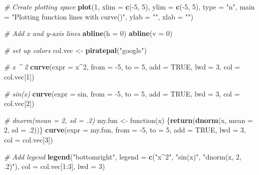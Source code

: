 \documentclass[]{book}
\newenvironment{Shaded}{\begin{snugshade}}{\end{snugshade}}
\newcommand{\KeywordTok}[1]{\textcolor[rgb]{0.13,0.29,0.53}{\textbf{{#1}}}}
\newcommand{\DataTypeTok}[1]{\textcolor[rgb]{0.13,0.29,0.53}{{#1}}}
\newcommand{\DecValTok}[1]{\textcolor[rgb]{0.00,0.00,0.81}{{#1}}}
\newcommand{\StringTok}[1]{\textcolor[rgb]{0.31,0.60,0.02}{{#1}}}
\newcommand{\CommentTok}[1]{\textcolor[rgb]{0.56,0.35,0.01}{\textit{{#1}}}}
\newcommand{\OtherTok}[1]{\textcolor[rgb]{0.56,0.35,0.01}{{#1}}}
\newcommand{\NormalTok}[1]{{#1}}
\theoremstyle{definition}
\theoremstyle{definition}
\theoremstyle{remark}
\begin{document}
\begin{Shaded}
\begin{Highlighting}[]
\CommentTok{# Create plotting space}
\KeywordTok{plot}\NormalTok{(}\DecValTok{1}\NormalTok{, }
     \DataTypeTok{xlim =} \KeywordTok{c}\NormalTok{(-}\DecValTok{5}\NormalTok{, }\DecValTok{5}\NormalTok{), }\DataTypeTok{ylim =} \KeywordTok{c}\NormalTok{(-}\DecValTok{5}\NormalTok{, }\DecValTok{5}\NormalTok{),}
     \DataTypeTok{type =} \StringTok{"n"}\NormalTok{, }
     \DataTypeTok{main =} \StringTok{"Plotting function lines with curve()"}\NormalTok{,}
     \DataTypeTok{ylab =} \StringTok{""}\NormalTok{, }\DataTypeTok{xlab =} \StringTok{""}\NormalTok{)}

\CommentTok{# Add x and y-axis lines}
\KeywordTok{abline}\NormalTok{(}\DataTypeTok{h =} \DecValTok{0}\NormalTok{)}
\KeywordTok{abline}\NormalTok{(}\DataTypeTok{v =} \DecValTok{0}\NormalTok{)}

\CommentTok{# set up colors}
\NormalTok{col.vec <-}\StringTok{ }\KeywordTok{piratepal}\NormalTok{(}\StringTok{"google"}\NormalTok{)}

\CommentTok{# x ^ 2}
\KeywordTok{curve}\NormalTok{(}\DataTypeTok{expr =} \NormalTok{x^}\DecValTok{2}\NormalTok{, }\DataTypeTok{from =} \NormalTok{-}\DecValTok{5}\NormalTok{, }\DataTypeTok{to =} \DecValTok{5}\NormalTok{,}
      \DataTypeTok{add =} \OtherTok{TRUE}\NormalTok{, }\DataTypeTok{lwd =} \DecValTok{3}\NormalTok{, }\DataTypeTok{col =} \NormalTok{col.vec[}\DecValTok{1}\NormalTok{])}

\CommentTok{# sin(x)}
\KeywordTok{curve}\NormalTok{(}\DataTypeTok{expr =} \NormalTok{sin, }\DataTypeTok{from =} \NormalTok{-}\DecValTok{5}\NormalTok{, }\DataTypeTok{to =} \DecValTok{5}\NormalTok{,}
      \DataTypeTok{add =} \OtherTok{TRUE}\NormalTok{, }\DataTypeTok{lwd =} \DecValTok{3}\NormalTok{, }\DataTypeTok{col =} \NormalTok{col.vec[}\DecValTok{2}\NormalTok{])}

\CommentTok{# dnorm(mean = 2, sd = .2)}
\NormalTok{my.fun <-}\StringTok{ }\NormalTok{function(x) \{}\KeywordTok{return}\NormalTok{(}\KeywordTok{dnorm}\NormalTok{(x, }\DataTypeTok{mean =} \DecValTok{2}\NormalTok{, }\DataTypeTok{sd =} \NormalTok{.}\DecValTok{2}\NormalTok{))\}}
\KeywordTok{curve}\NormalTok{(}\DataTypeTok{expr =} \NormalTok{my.fun, }
      \DataTypeTok{from =} \NormalTok{-}\DecValTok{5}\NormalTok{, }\DataTypeTok{to =} \DecValTok{5}\NormalTok{,}
      \DataTypeTok{add =} \OtherTok{TRUE}\NormalTok{, }
      \DataTypeTok{lwd =} \DecValTok{3}\NormalTok{, }\DataTypeTok{col =} \NormalTok{col.vec[}\DecValTok{3}\NormalTok{])}

\CommentTok{# Add legend}
\KeywordTok{legend}\NormalTok{(}\StringTok{"bottomright"}\NormalTok{,}
       \DataTypeTok{legend =} \KeywordTok{c}\NormalTok{(}\StringTok{"x^2"}\NormalTok{, }\StringTok{"sin(x)"}\NormalTok{, }\StringTok{"dnorm(x, 2, .2)"}\NormalTok{),}
       \DataTypeTok{col =} \NormalTok{col.vec[}\DecValTok{1}\NormalTok{:}\DecValTok{3}\NormalTok{], }
       \DataTypeTok{lwd =} \DecValTok{3}\NormalTok{)}
\end{Highlighting}
\end{Shaded}
\end{document}
